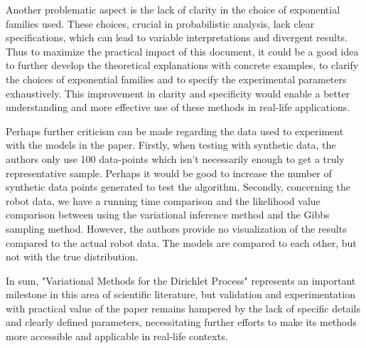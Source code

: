 \documentclass{article}
\begin{document}
Another problematic aspect is the lack of clarity in the choice of exponential families used. These choices, crucial in probabilistic analysis, lack clear specifications, which can lead to variable interpretations and divergent results. Thus to maximize the practical impact of this document, it could be a good idea to further develop the theoretical explanations with concrete examples, to clarify the choices of exponential families and to specify the experimental parameters exhaustively. This improvement in clarity and specificity would enable a better understanding and more effective use of these methods in real-life applications.

Perhaps further criticism can be made regarding the data used to experiment with the models in the paper. Firstly, when testing with synthetic data, the authors  only use 100 data-points which isn't necessarily enough to get a truly representative sample. Perhaps it would be good to increase the number of synthetic data points generated to test the algorithm. Secondly, concerning the robot data, we have a running time comparison and the likelihood value comparison between using the variational inference method and the Gibbs sampling method. However, the authors provide no visualization of the results compared to the actual robot data. The models are compared to each other, but not with the true distribution. 

In sum, "Variational Methods for the Dirichlet Process" represents an important milestone in this area of scientific literature, but validation and experimentation with practical value of the paper remains hampered by the lack of specific details and clearly defined parameters, necessitating further efforts to make its methods more accessible and applicable in real-life contexts.
\end{document}
